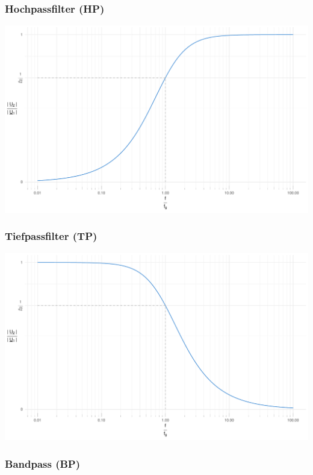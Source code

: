 \documentclass[a4paper, 12pt]{article}
\begin{document}
  \begin{center}
  \subsubsection*{Hochpassfilter (HP)}

    \includegraphics[scale=0.5]{./R/RL_HP/RL_HP_clean_alt.pdf}

  \vspace{0.021276873\paperheight}

  \subsubsection*{Tiefpassfilter (TP)}

    \includegraphics[scale=0.5]{./R/RC_LP/RC_LP_clean.pdf}

  \subsubsection*{Bandpass (BP)}


\end{center}
\end{document}
